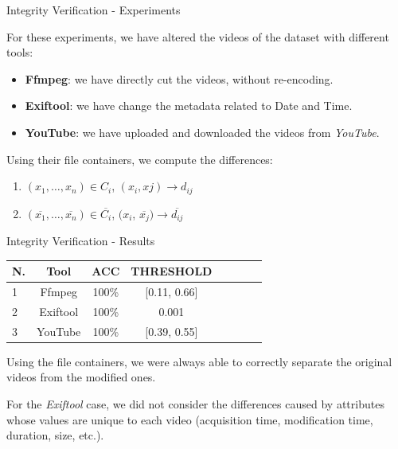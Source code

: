 \begin{tframe}{Integrity Verification - Experiments}

For these experiments, we have altered the videos of the dataset with different tools:

\begin{itemize}
\item \textbf{Ffmpeg}: we have directly cut the videos, without re-encoding.
\vspace{0.1cm}
\item \textbf{Exiftool}: we have change the metadata related to Date and Time.
\vspace{0.1cm}
\item \textbf{YouTube}: we have uploaded and downloaded the videos from \emph{YouTube}.
\end{itemize}

\vspace{0.5cm}

Using their file containers, we compute the differences:

\begin{enumerate}

\item $(x_{1},\ldots,x_{n}) \in C_{i}$, $(x_{i}, x{j}) \rightarrow d_{ij}$
\vspace{0.1cm}
\item $(\overline{x_{1}},\ldots,\overline{x_{n}}) \in \overline{C_{i}}$, $(x_{i}$, $\overline{x_{j}}) \rightarrow \overline{d_{ij}}$ 

\end{enumerate}

\end{tframe}

\begin{tframe}{Integrity Verification - Results}

\begin{footnotesize}
\begin{table}[h!]
\centering
\begin{tabular}{l c c c c c c c} 
\hline \hline 
\textbf{N.} & \textbf{Tool} & \textbf{ACC} & \textbf{THRESHOLD}\\ [0.5ex]
\hline
1 & Ffmpeg & 100\% & [0.11, 0.66]\\
2 & Exiftool & 100\% &	0.001 \\
3 &	YouTube & 100\% & [0.39, 0.55] \\ 

\hline
\end{tabular}
\end{table}
\end{footnotesize}

\vspace{0.2cm}
Using the file containers, we were always able to correctly separate the original videos from the modified ones.

\vspace{0.5cm}
For the \emph{Exiftool} case, we did not consider the differences caused by attributes whose values are unique to each video (acquisition time, modification time, duration, size, etc.).

\end{tframe}

